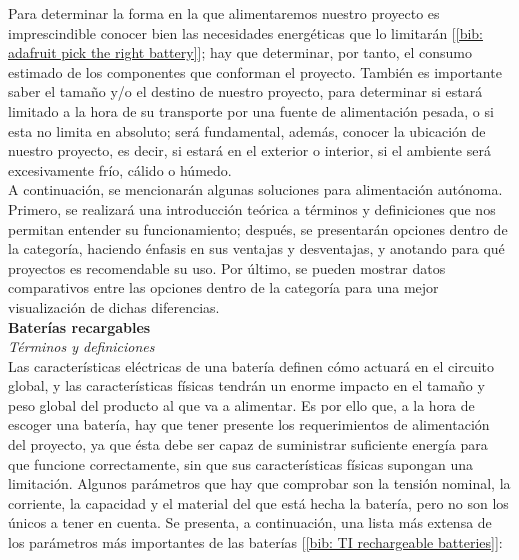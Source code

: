 \documentclass[12pt]{article}
\begin{document}
	\noindent Para determinar la forma en la que alimentaremos nuestro proyecto es imprescindible conocer bien las necesidades energéticas que lo limitarán [\ref{bib: adafruit pick the right battery}]; hay que determinar, por tanto, el consumo estimado de los componentes que conforman el proyecto. También es importante saber el tamaño y/o el destino de nuestro proyecto, para determinar si estará limitado a la hora de su transporte por una fuente de alimentación pesada, o si esta no limita en absoluto; será fundamental, además, conocer la ubicación de nuestro proyecto, es decir, si estará en el exterior o interior, si el ambiente será excesivamente frío, cálido o húmedo.\\
	
	\noindent A continuación, se mencionarán algunas soluciones para alimentación autónoma. Primero, se realizará una introducción teórica a términos y definiciones que nos permitan entender su funcionamiento; después, se presentarán opciones dentro de la categoría, haciendo énfasis en sus ventajas y desventajas, y anotando para qué proyectos es recomendable su uso. Por último, se pueden mostrar datos comparativos entre las opciones dentro de la categoría para una mejor visualización de dichas diferencias.\\ 
	
	\noindent \textbf{Baterías recargables} \\
	
	\noindent \textit{Términos y definiciones} \\
	
	\noindent Las características eléctricas de una batería definen cómo actuará en el circuito global, y las características físicas tendrán un enorme impacto en el tamaño y peso global del producto al que va a alimentar. Es por ello que, a la hora de escoger una batería, hay que tener presente los requerimientos de alimentación del proyecto, ya que ésta debe ser capaz de suministrar suficiente energía para que funcione correctamente, sin que sus características físicas supongan una limitación. Algunos parámetros que hay que comprobar son la tensión nominal, la corriente, la capacidad y el material del que está hecha la batería, pero no son los únicos a tener en cuenta. Se presenta, a continuación, una lista más extensa de los parámetros más importantes de las baterías [\ref{bib: TI rechargeable batteries}]: 
	
\end{document}
